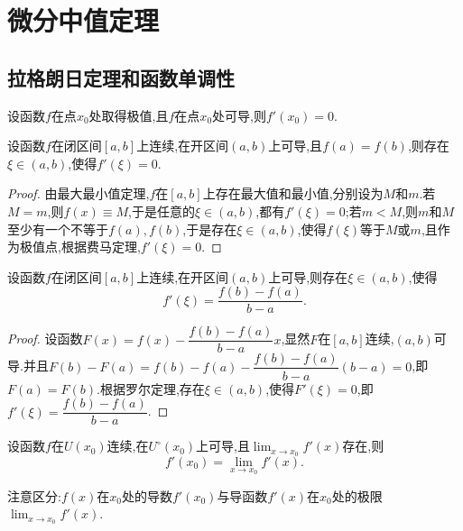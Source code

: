 \chapter{微分中值定理}
\section{拉格朗日定理和函数单调性}
\begin{theorem}[费马定理]
    设函数$f$在点$x_0$处取得极值,且$f$在点$x_0$处可导,则$f'(x_0)=0$.
\end{theorem}
\begin{theorem}[罗尔定理]
    设函数$f$在闭区间$[a,b]$上连续,在开区间$(a,b)$上可导,且$f(a)=f(b)$,则存在$\xi\in(a,b)$,使得$f'(\xi)=0$.
\end{theorem}
\begin{proof}
    由最大最小值定理,$f$在$[a,b]$上存在最大值和最小值,分别设为$M$和$m$.若$M=m$,则$f(x)\equiv M$,于是任意的$\xi\in(a,b)$,都有$f'(\xi)=0$;若$m<M$,则$m$和$M$至少有一个不等于$f(a),f(b)$,于是存在$\xi\in(a,b)$,使得$f(\xi)$等于$M$或$m$,且作为极值点,根据费马定理,$f'(\xi)=0$.
\end{proof}
\begin{theorem}[拉格朗日定理]
    设函数$f$在闭区间$[a,b]$上连续,在开区间$(a,b)$上可导,则存在$\xi\in(a,b)$,使得
    \begin{equation*}
        f'(\xi)=\dfrac{f(b)-f(a)}{b-a}.
    \end{equation*}
\end{theorem}
\begin{proof}
    设函数$F(x)=f(x)-\dfrac{f(b)-f(a)}{b-a}x$,显然$F$在$[a,b]$连续,$(a,b)$可导.并且$F(b)-F(a)=f(b)-f(a)-\dfrac{f(b)-f(a)}{b-a}(b-a)=0$,即$F(a)=F(b)$.根据罗尔定理,存在$\xi\in(a,b)$,使得$F'(\xi)=0$,即$f'(\xi)=\dfrac{f(b)-f(a)}{b-a}$.
\end{proof}
\begin{theorem}[导数极限定理]
    设函数$f$在$U(x_0)$连续,在$U^{\circ}(x_0)$上可导,且$\displaystyle\lim_{x\to x_0}f'(x)$存在,则\[f'(x_0)=\displaystyle\lim_{x\to x_0}f'(x).\]
\end{theorem}
注意区分:$f(x)$在$x_0$处的导数$f'(x_0)$与导函数$f'(x)$在$x_0$处的极限$\displaystyle\lim_{x\to x_0}f'(x)$.

